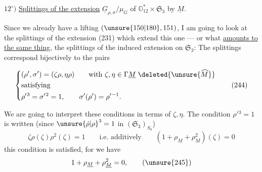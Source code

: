 $12^\circ)$ \uline{Splittings of the extension}
$\underline G_{\rho,\sigma}/\mu_G$ of
$\mathbb O_{12}^{*}\times\mathfrak S_3$
by $\underline M$.

Since we already have a lifting
$(\unsure{150|180},151)$, I am going to look at the splittings
of the extension (231) which extend this one --- or what
\uline{amounts to the same thing}, the splittings
of the induced extension on $\mathfrak S_3$:
The splittings correspond 
bijectively to the pairs



\[
\left\{\begin{aligned}
 &(\rho',\sigma')=(\zeta\rho,\eta\rho)
   \qquad\text{with }\zeta,\eta\in\Gamma\underline M
   \;\deleted{\unsure{\widehat M}}\\
 &\text{satisfying}\\
 &\rho'{}^3=\sigma'{}^2=1,\qquad
   \sigma'(\rho')=\rho'{}^{-1}.
\end{aligned}\right.
\tag{244}
\]

We are going to interpret these conditions in terms of $\zeta,\eta$.
The condition $\rho'{}^3=1$ is written
(since $\unsure{\dot\rho|\rho}^3=1$ in $(\mathfrak S_3)_{S_0}$)
\[
\zeta\rho(\zeta)\rho^2(\zeta)=1
\qquad\text{i.e. additively}\qquad
(1+\rho_{\underline M}+\rho_{\underline M}^2)(\zeta)=0
\tag{245}
\]
this condition is  satisfied, for we have
\[
1+\rho_{\underline M}+\rho_{\underline M}^2=0,
\tag{\unsure{245}}
\]

